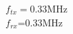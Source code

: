 \documentclass[preview]{standalone}
\begin{document}
\begin{center}
$f_{tx}=$0.33MHz\\$f_{rx}$=0.33MHz
\end{center}
\end{document}

